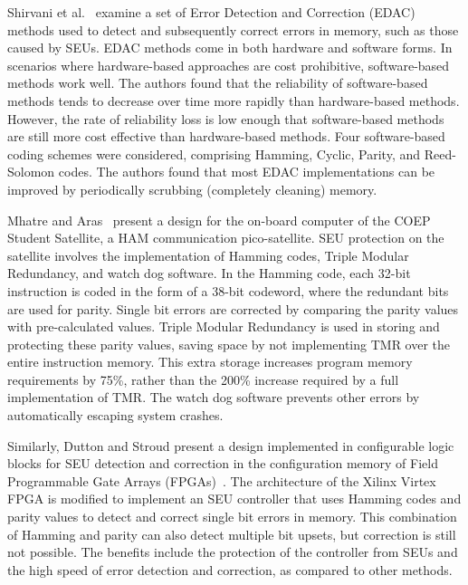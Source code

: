 Shirvani et al.~\cite{Shirvani2001EDAC} examine a set of Error Detection and Correction (EDAC) methods used to detect and subsequently correct errors in memory, such as those caused by SEUs. EDAC methods come in both hardware and software forms. In scenarios where hardware-based approaches are cost prohibitive, software-based methods work well. The authors found that the reliability of software-based methods tends to decrease over time more rapidly than hardware-based methods. However, the rate of reliability loss is low enough that software-based methods are still more cost effective than hardware-based methods. Four software-based coding schemes were considered, comprising Hamming, Cyclic, Parity, and Reed-Solomon codes. The authors found that most EDAC implementations can be improved by periodically scrubbing (completely cleaning) memory.

Mhatre and Aras~\cite{mhatreSeuTmr} present a design for the on-board computer of the COEP Student Satellite, a HAM communication pico-satellite. SEU protection on the satellite involves the implementation of Hamming codes, Triple Modular Redundancy, and watch dog software. In the Hamming code, each 32-bit instruction is coded in the form of a 38-bit codeword, where the redundant bits are used for parity. Single bit errors are corrected by comparing the parity values with pre-calculated values. Triple Modular Redundancy is used in storing and protecting these parity values, saving space by not implementing TMR over the entire instruction memory. This extra storage increases program memory requirements by 75\%, rather than the 200\% increase required by a full implementation of TMR. The watch dog software prevents other errors by automatically escaping system crashes.

Similarly, Dutton and Stroud present a design implemented in configurable logic blocks for SEU detection and correction in the configuration memory of Field Programmable Gate Arrays (FPGAs)~\cite{CATA09seuonVirtex}. The architecture of the Xilinx Virtex FPGA is modified to implement an SEU controller that uses Hamming codes and parity values to detect and correct single bit errors in memory. This combination of Hamming and parity can also detect multiple bit upsets, but correction is still not possible. The benefits include the protection of the controller from SEUs and the high speed of error detection and correction, as compared to other methods.




